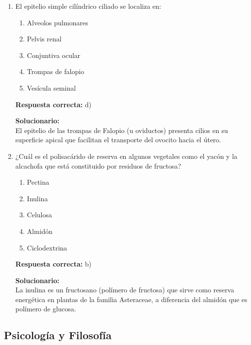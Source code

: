 \begin{enumerate}
	\item El epitelio simple cilíndrico ciliado se localiza en:
	\begin{enumerate}[label=\alph*)]
		\item Alveolos pulmonares
		\item Pelvis renal
		\item Conjuntiva ocular
		\item Trompas de falopio
		\item Vesícula seminal
	\end{enumerate}
	\textbf{Respuesta correcta:} d)
	
	\vspace{2mm}
	\textbf{Solucionario:}\\
	El epitelio de las trompas de Falopio (u oviductos) presenta cilios en su superficie apical que facilitan el transporte del ovocito hacia el útero.
	
	
	\vspace{6mm}
	
	\item ¿Cuál es el polisacárido de reserva en algunos vegetales como el yacón y la alcachofa que está constituido por residuos de fructosa?
	\begin{enumerate}[label=\alph*)]
		\item Pectina
		\item Inulina
		\item Celulosa
		\item Almidón
		\item Ciclodextrina
	\end{enumerate}
	\textbf{Respuesta correcta:} b)
	
	\vspace{2mm}
	\textbf{Solucionario:}\\
	La inulina es un fructosano (polímero de fructosa) que sirve como reserva energética en plantas de la familia Asteraceae, a diferencia del almidón que es polímero de glucosa.
	
	
	\vspace{6mm}
\end{enumerate}

\subsection*{Psicología y Filosofía}

